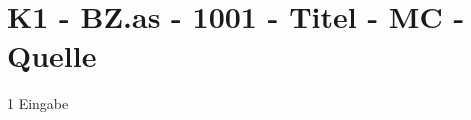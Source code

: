 \section{K1 - BZ.as - 1001 - Titel - MC - Quelle}

\begin{langesbeispiel} \item[1] %
Eingabe
\end{langesbeispiel}